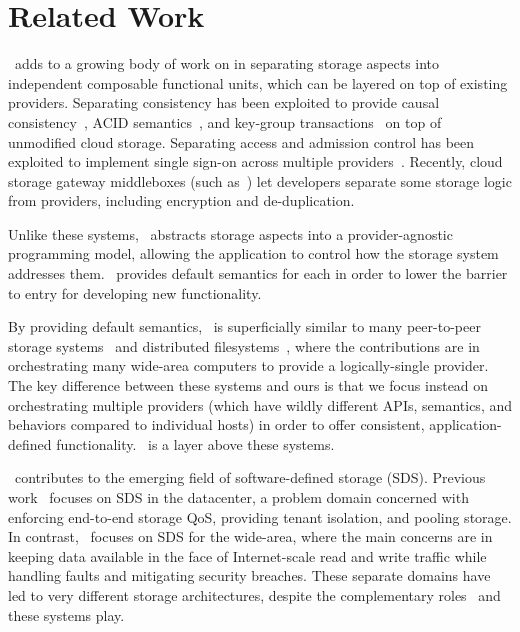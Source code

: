 \section{Related Work}
\label{sec:related}

\Syndicate\ adds to a growing body of work on in separating storage 
aspects into independent composable functional units, which can be layered on top
of existing providers.
Separating consistency has been exploited
to provide causal consistency~\cite{bolt-on-causal-consistency},
ACID semantics~\cite{deuteronomy}, and key-group transactions~\cite{g-store} on
top of unmodified cloud storage.  Separating access and admission control 
has been exploited to implement single sign-on across multiple providers~\cite{openid,oauth,kerberos}.
Recently, cloud storage gateway middleboxes 
(such as~\cite{riverbed-gateway, twinstrata-gateway}) let developers
separate some storage logic from providers, including
encryption and de-duplication.

Unlike these systems, \Syndicate\ abstracts storage aspects into a provider-agnostic 
programming model, allowing the application to control how 
the storage system addresses them.  \Syndicate\ provides default semantics for each 
in order to lower the barrier to entry for developing new functionality.

By providing default semantics, \Syndicate\ is superficially similar to many peer-to-peer storage 
systems~\cite{oceanstore,bayou,practi,pastry,dot}
and distributed filesystems~\cite{wheelfs,farsite,tahoe-lafs,shark,ivy}, where the 
contributions are in orchestrating many wide-area computers to provide a logically-single
provider.  The key difference between these systems and ours is that we focus instead 
on orchestrating multiple providers (which have wildly different APIs, semantics, and behaviors
compared to individual hosts) in order to offer consistent, application-defined functionality.
\Syndicate\ is a layer above these systems.

\Syndicate\ contributes to the emerging field of software-defined storage (SDS).  Previous
work~\cite{ioflow,oktopus} focuses on SDS in the datacenter, a problem domain concerned 
with enforcing end-to-end storage QoS, providing tenant isolation, and 
pooling storage.  In contrast, \Syndicate\ focuses on SDS for the wide-area, where the main 
concerns are in keeping data available in the face of Internet-scale read and write traffic 
while handling faults and mitigating security breaches.  These separate domains have
led to very different storage architectures, despite the complementary
roles \Syndicate\ and these systems play.